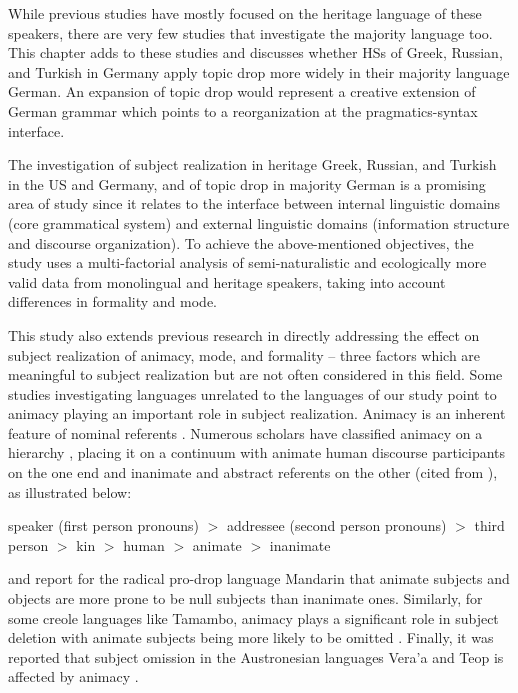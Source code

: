 \documentclass[output=paper,colorlinks,citecolor=brown]{langscibook}
\begin{document}
While previous studies have mostly focused on the heritage language of these speakers, there are very few studies that investigate the majority language too. This chapter adds to these studies and discusses whether HSs of Greek, Russian, and Turkish in Germany apply topic drop more widely in their majority language German. An expansion of topic drop would represent a creative extension of German grammar which points to a reorganization at the pragmatics-syntax interface.

The investigation of subject realization in heritage Greek, Russian, and Turkish in the US and Germany, and of topic drop in majority German is a promising area of study since it relates to the interface between internal linguistic domains (core grammatical system) and external linguistic domains (information structure and discourse organization). To achieve the above-mentioned objectives, the study uses a multi-factorial analysis of semi-naturalistic and ecologically more valid data from monolingual and heritage speakers, taking into account differences in formality and mode.

This study also extends previous research in directly addressing the effect on subject realization of animacy, mode, and formality --
three factors which are meaningful to subject realization but are not often considered in this field. Some studies investigating languages unrelated to the languages of our study point to animacy playing an important role in subject realization.
Animacy is an inherent feature of nominal referents \parencite{corbett1979agreement, comrie1989}. 
Numerous scholars have classified animacy on a hierarchy \parencite{Silverstein1986}, placing it on a continuum with animate human discourse participants on the one end and inanimate and abstract referents on the other (cited from \cite[90]{corbett2000number}), as illustrated below:

\ea
speaker (first person pronouns) $>$ addressee (second person pronouns) $>$ third person $>$ kin $>$ human $>$ animate $>$ inanimate
\z

\textcite{li2012variation} and \textcite{pu1997zero} report for the radical pro-drop language Mandarin that animate subjects and objects are more prone to be null subjects than inanimate ones. Similarly, for some creole languages like Tamambo, animacy plays a significant role in subject deletion with animate subjects being more likely to be omitted \parencite{meyerhoff2009replication}. 
Finally, it was reported that subject omission in the Austronesian languages Vera'a and Teop is affected by animacy \parencite{vollmer2019radical}.
\end{document}

